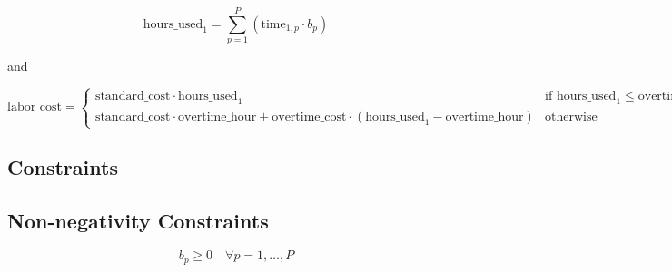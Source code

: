 \documentclass{article}
\begin{document}
\[
\text{hours\_used}_1 = \sum_{p=1}^{P} \left( \text{time}_{1,p} \cdot b_p \right)
\]

and 

\[
\text{labor\_cost} = 
\begin{cases} 
    \text{standard\_cost} \cdot \text{hours\_used}_1 & \text{if } \text{hours\_used}_1 \leq \text{overtime\_hour} \\
    \text{standard\_cost} \cdot \text{overtime\_hour} + \text{overtime\_cost} \cdot (\text{hours\_used}_1 - \text{overtime\_hour}) & \text{otherwise}
\end{cases}
\]

\subsection*{Constraints}

\]

\subsection*{Non-negativity Constraints}
\[
b_p \geq 0 \quad \forall p = 1, \ldots, P
\]
\end{document}
